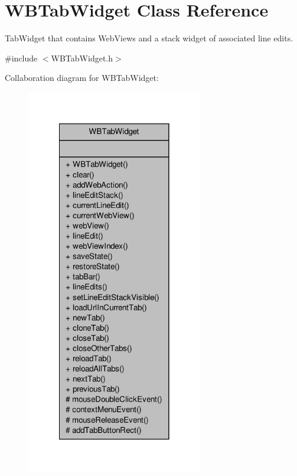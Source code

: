 \hypertarget{class_w_b_tab_widget}{\section{W\-B\-Tab\-Widget Class Reference}
\label{de/dc7/class_w_b_tab_widget}
}


Tab\-Widget that contains Web\-Views and a stack widget of associated line edits.  




{\ttfamily \#include $<$W\-B\-Tab\-Widget.\-h$>$}



Collaboration diagram for W\-B\-Tab\-Widget\-:
\nopagebreak
\begin{figure}[H]
\begin{center}
\leavevmode
\includegraphics[width=218pt]{da/df8/class_w_b_tab_widget__coll__graph}
\end{center}
\end{figure}
